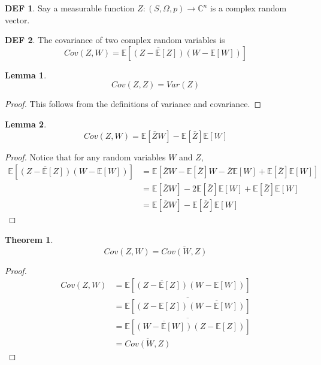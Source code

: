 \documentclass{article}
\newtheorem{theorem}{Theorem}
\theoremstyle{definition}\newtheorem{definition}{DEF}
\theoremstyle{lemma}\newtheorem{lemma}{Lemma}
\theoremstyle{corrolary}\newtheorem{corrolary}{Cor}
\begin{document}
\begin{definition}
Say a measurable function $Z: (S, \Omega, p)\rightarrow \mathbb{C}^n$ is a complex random vector.
\end{definition}

\begin{definition}
The covariance of two complex random variables is
\begin{equation}
Cov(Z, W) = \mathbb{E}[\overline{(Z - \mathbb{E}[Z])}(W-\mathbb{E}[W])]
\end{equation}
\end{definition}

\begin{lemma}
\begin{equation}
Cov(Z, Z) = Var(Z)
\end{equation}
\end{lemma}
\begin{proof}
This follows from the definitions of variance and covariance.
\end{proof}

\begin{lemma}
\begin{equation}
Cov(Z, W) = \mathbb{E}[\bar{Z}W] - \mathbb{E}[\bar{Z}] \mathbb{E}[W]
\end{equation}
\end{lemma}
\begin{proof}
Notice that for any random variables $W$ and $Z$,
\begin{align*}
\mathbb{E}[\overline{(Z - \mathbb{E}[Z])}(W - \mathbb{E}[W])]
&= \mathbb{E}[\bar{Z}W -\mathbb{E}[\bar{Z}]W -\bar{Z}\mathbb{E}[W] + \mathbb{E}[\bar{Z}]\mathbb{E}[W]] \\
&= \mathbb{E}[\bar{Z}W] -2\mathbb{E}[\bar{Z}]\mathbb{E}[W] + \mathbb{E}[\bar{Z}]\mathbb{E}[W]\\
&= \mathbb{E}[\bar{Z}W]-\mathbb{E}[\bar{Z}]\mathbb{E}[W]
\end{align*}
\end{proof}

\begin{theorem}
\begin{equation}
Cov(Z,W)=\overline{Cov(W,Z)}
\end{equation}
\end{theorem}
\begin{proof}
\begin{align*}
Cov(Z,W)
&= \mathbb{E}[\overline{(Z - \mathbb{E}[Z])}(W - \mathbb{E}[W])] \\
&= \overline{\mathbb{E}[(Z - \mathbb{E}[Z])\overline{(W - \mathbb{E}[W])}]} \\
&= \overline{\mathbb{E}[\overline{(W - \mathbb{E}[W])}(Z - \mathbb{E}[Z])]} \\
&=\overline{Cov(W,Z)}
\end{align*}
\end{proof}
\end{document}

